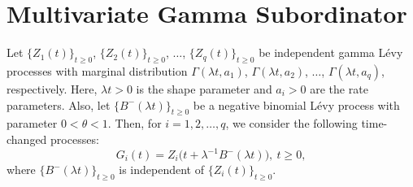 \documentclass[12pt,oneside,reqno]{amsart}
\numberwithin{equation}{section}
\theoremstyle{definition}
\numberwithin{equation}{section}
\theoremstyle{remarkstyle}
\begin{document}
 
 
 
 
\section{Multivariate Gamma Subordinator}
Let $\{Z_1(t)\}_{t\ge0}$, $\{Z_2(t)\}_{t\ge0}$, $\dots$,    $\{Z_q(t)\}_{t\ge0}$ be independent gamma L\'evy processes with marginal distribution $\Gamma(\lambda t, a_1)$, $\Gamma(\lambda t, a_2)$, $\dots$, $\Gamma(\lambda t, a_q)$, respectively. Here, $\lambda t>0$ is the shape parameter and $a_i>0$ are the rate parameters. Also, let $\{B^-(\lambda t)\}_{t\ge 0}$ be a negative binomial L\'evy process with parameter $0<\theta<1$. Then, for $i=1,2,\dots,q$, we consider the following time-changed processes: 
\begin{equation}\label{multi_gamma}
G_i(t)= Z_i\bigl(t + \lambda^{-1} B^{-}(\lambda t)\bigr), \ t\ge0,
\end{equation}
where $\{B^{-}(\lambda t)\}_{t\ge 0}$ is independent of $\{Z_i(t)\}_{t\ge0}$.
\end{document}
